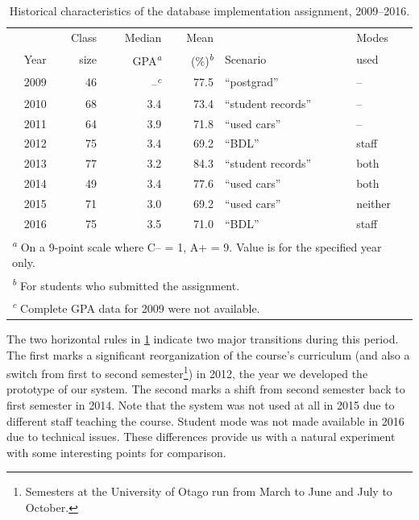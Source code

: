 \documentclass[sigconf, authordraft, capitalise]{acmart}
\begin{document}
\begin{table}
    \begin{tabular}{rrrrll}
        \toprule
                &   Class   &   Median                          &   Mean                            &               &   Modes   \\
        Year    &   size    &   GPA\textsuperscript{\emph{a}}   &   (\%)\textsuperscript{\emph{b}}  &   Scenario    &   used    \\
        \midrule
        2009    &   46  &   --\textsuperscript{\emph{c}} &   77.5    &   ``postgrad''        &   --  \\
        2010    &   68  &   3.4 &   73.4    &   ``student records'' &   --  \\
        2011    &   64  &   3.9 &   71.8    &   ``used cars''       &   --  \\
        \midrule
        2012    &   75  &   3.4 &   69.2    &   ``BDL''             &   staff   \\
        2013    &   77  &   3.2 &   84.3    &   ``student records'' &   both \\
        \midrule
        2014    &   49  &   3.4 &   77.6    &   ``used cars''       &   both \\
        2015    &   71  &   3.0 &   69.2    &   ``used cars''       &   neither  \\
        2016    &   75  &   3.5 &   71.0    &   ``BDL''             &   staff   \\
        \bottomrule
        \multicolumn{6}{l}{\footnotesize \textsuperscript{\emph{a}} On a 9-point scale where C-- = 1, A+ = 9. Value is for the specified year only.}    \\
        \multicolumn{6}{l}{\footnotesize \textsuperscript{\emph{b}} For students who submitted the assignment.}    \\
        \multicolumn{6}{l}{\footnotesize \textsuperscript{\emph{c}} Complete GPA data for 2009 were not available.}    \\
    \end{tabular}
    \caption{Historical characteristics of the database implementation assignment, 2009--2016.}
    \label{tab-data}
\end{table}


The two horizontal rules in \cref{tab-data} indicate two major transitions during this period. The first marks a significant reorganization of the course's curriculum (and also a switch from first to second semester\footnote{Semesters at the University of Otago run from March to June and July to October.}) in 2012, the year we developed the prototype of our system. The second marks a shift from second semester back to first semester in 2014. Note that the system was not used at all in 2015 due to different staff teaching the course. Student mode was not made available in 2016 due to technical issues. These differences provide us with a natural experiment with some interesting points for comparison.
\end{document}
